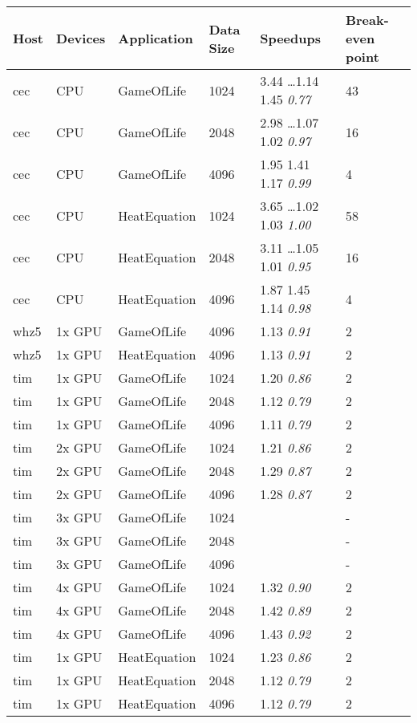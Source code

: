 \begin{tabular}{| l | l | l | l | l | l |}
\hline
\textbf{Host} & \textbf{Devices} & \textbf{Application} & \textbf{Data Size} & \textbf{Speedups} & \textbf{Break-even point}\\
\hline
cec & CPU & GameOfLife & 1024 & 3.44 \ldots 1.14 1.45 \textit{0.77} & 43 \\
cec & CPU & GameOfLife & 2048 & 2.98 \ldots 1.07 1.02 \textit{0.97} & 16 \\
cec & CPU & GameOfLife & 4096 & 1.95 1.41 1.17 \textit{0.99} & 4 \\
cec & CPU & HeatEquation & 1024 & 3.65 \ldots 1.02 1.03 \textit{1.00} & 58 \\
cec & CPU & HeatEquation & 2048 & 3.11 \ldots 1.05 1.01 \textit{0.95} & 16 \\
cec & CPU & HeatEquation & 4096 & 1.87 1.45 1.14 \textit{0.98} & 4 \\
whz5 & 1x GPU & GameOfLife & 4096 & 1.13 \textit{0.91} & 2 \\
whz5 & 1x GPU & HeatEquation & 4096 & 1.13 \textit{0.91} & 2 \\
tim & 1x GPU & GameOfLife & 1024 & 1.20 \textit{0.86} & 2 \\
tim & 1x GPU & GameOfLife & 2048 & 1.12 \textit{0.79} & 2 \\
tim & 1x GPU & GameOfLife & 4096 & 1.11 \textit{0.79} & 2 \\
tim & 2x GPU & GameOfLife & 1024 & 1.21 \textit{0.86} & 2 \\
tim & 2x GPU & GameOfLife & 2048 & 1.29 \textit{0.87} & 2 \\
tim & 2x GPU & GameOfLife & 4096 & 1.28 \textit{0.87} & 2 \\
tim & 3x GPU & GameOfLife & 1024 &  & - \\
tim & 3x GPU & GameOfLife & 2048 &  & - \\
tim & 3x GPU & GameOfLife & 4096 &  & - \\
tim & 4x GPU & GameOfLife & 1024 & 1.32 \textit{0.90} & 2 \\
tim & 4x GPU & GameOfLife & 2048 & 1.42 \textit{0.89} & 2 \\
tim & 4x GPU & GameOfLife & 4096 & 1.43 \textit{0.92} & 2 \\
tim & 1x GPU & HeatEquation & 1024 & 1.23 \textit{0.86} & 2 \\
tim & 1x GPU & HeatEquation & 2048 & 1.12 \textit{0.79} & 2 \\
tim & 1x GPU & HeatEquation & 4096 & 1.12 \textit{0.79} & 2 \\

\end{tabular}

